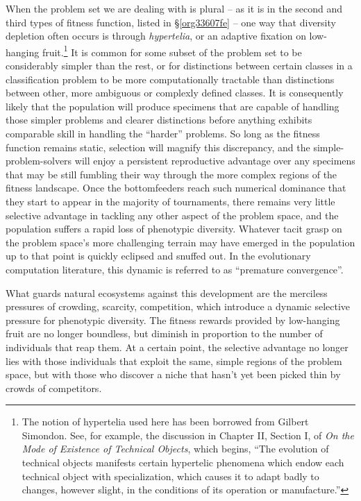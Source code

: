 \documentclass[12pt,glossary]{dalthesis}
\begin{document}
When the problem set we are dealing with is plural -- as it is in the second and third types
of fitness function, listed in \S \ref{org33607fe} -- one way that diversity depletion often
occurs is through \emph{hypertelia}, or an adaptive fixation on low-hanging fruit.\footnote{The notion of hypertelia used here has been borrowed from Gilbert Simondon. See,
  for example, the discussion in Chapter II, Section I, of 
  \emph{On the Mode of Existence of Technical Objects}, which begins, ``The evolution of technical objects manifests certain hypertelic phenomena which
  endow each technical object with specialization, which causes it to adapt badly
  to changes, however slight, in the conditions of its operation or manufacture.''} 
It is common for some subset of the problem set to be considerably simpler than the rest,
or for distinctions between certain classes in a classification problem to be more computationally
tractable than distinctions between other, more ambiguous or complexly defined classes. 
It is consequently likely that the population will produce specimens that are capable of
handling those simpler problems and clearer distinctions before anything exhibits comparable
skill in handling the ``harder'' problems. So long as the fitness function remains static,
selection will magnify this discrepancy, and the simple-problem-solvers will enjoy a persistent
reproductive advantage over any specimens that may be still fumbling their way through the
more complex regions of the fitness landscape. Once the bottomfeeders reach such numerical
dominance that they start to appear in the majority of tournaments, there remains very little
selective advantage in tackling any other aspect of the problem space, and the population
suffers a rapid loss of phenotypic diversity. Whatever tacit grasp on the problem
space's more challenging terrain may have emerged in the population up to that point is
quickly eclipsed and snuffed out. In the evolutionary computation literature, this dynamic
is referred to as ``premature convergence''. 

What guards natural ecosystems against this development are the merciless
pressures of crowding, scarcity, competition, which introduce a dynamic selective
pressure for phenotypic diversity. The fitness rewards provided by low-hanging
fruit are no longer boundless, but diminish in proportion to the number of
individuals that reap them. At a certain point, the selective advantage no longer
lies with those individuals that exploit the same, simple regions of the problem
space, but with those who discover a niche that hasn't yet been picked thin by
crowds of competitors.
\end{document}

